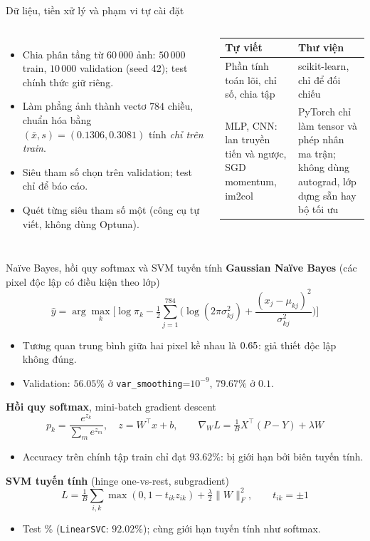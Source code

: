 \documentclass[aspectratio=169,10pt,t]{beamer}
\newcommand{\bul}{\begin{itemize}\setlength{\itemsep}{4pt}}
\newcommand{\eul}{\end{itemize}}
\begin{document}
\begin{frame}{Dữ liệu, tiền xử lý và phạm vi tự cài đặt}
  \begin{columns}[T]
    \small
    \bul
      \item Chia phân tầng từ $60\,000$ ảnh: $50\,000$ train, $10\,000$ validation (seed 42); test chính thức giữ riêng.
      \item Làm phẳng ảnh thành vectơ $784$ chiều, chuẩn hóa bằng $(\bar x,s)=(0.1306,0.3081)$ tính \emph{chỉ trên train}.
      \item Siêu tham số chọn trên validation; test chỉ để báo cáo.
      \item Quét từng siêu tham số một (công cụ tự viết, không dùng Optuna).
    \eul
    \footnotesize
    \begin{tabular}{@{}>{\raggedright\arraybackslash}p{2.7cm}>{\raggedright\arraybackslash}p{3.5cm}@{}}
      \toprule
      \textbf{Tự viết} & \textbf{Thư viện} \\
      \midrule
      Phần tính toán lõi, chỉ số, chia tập & scikit-learn, chỉ để đối chiếu \\[3pt]
      MLP, CNN: lan truyền tiến và ngược, SGD momentum, im2col & PyTorch chỉ làm tensor và phép nhân ma trận; không dùng autograd, lớp dựng sẵn hay bộ tối ưu \\
      \bottomrule
    \end{tabular}
  \end{columns}
\end{frame}

\begin{frame}{Naïve Bayes, hồi quy softmax và SVM tuyến tính}
  \small
  \textbf{Gaussian Naïve Bayes} (các pixel độc lập có điều kiện theo lớp)
  \[
    \hat y=\arg\max_k\Big[\log\pi_k-\tfrac12\sum_{j=1}^{784}\Big(\log(2\pi\sigma_{kj}^2)+\frac{(x_j-\mu_{kj})^2}{\sigma_{kj}^2}\Big)\Big]
  \]
  \vspace{-4pt}
  \bul
    \item Tương quan trung bình giữa hai pixel kề nhau là $0.65$: giả thiết độc lập không đúng.
    \item Validation: $56.05\%$ ở \texttt{var\_smoothing}=$10^{-9}$, $79.67\%$ ở $0.1$.
  \eul
  \medskip
  \textbf{Hồi quy softmax}, mini-batch gradient descent
  \[
    p_k=\frac{e^{z_k}}{\sum_m e^{z_m}},\quad z=W^{\top}x+b,\qquad \nabla_W L=\tfrac1B X^{\top}(P-Y)+\lambda W
  \]
  \vspace{-4pt}
  \bul
    \item Accuracy trên chính tập train chỉ đạt $93.62\%$: bị giới hạn bởi biên tuyến tính.
  \eul
  \medskip
  \textbf{SVM tuyến tính} (hinge one-vs-rest, subgradient)
  \[
    L=\tfrac1B\sum_{i,k}\max(0,1-t_{ik}z_{ik})+\tfrac{\lambda}2\lVert W\rVert_F^2,\qquad t_{ik}=\pm1
  \]
  \vspace{-4pt}
  \bul
    \item Test \svmAccTest\% (\texttt{LinearSVC}: $92.02\%$); cùng giới hạn tuyến tính như softmax.
  \eul
\end{frame}
\end{document}
